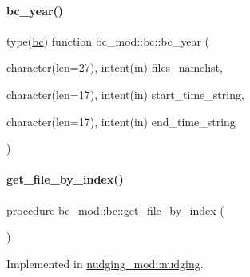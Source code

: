\mbox{\label{structbc__mod_1_1bc_ad1e474e0627921dd48884966e30f379d}} 
\paragraph{\texorpdfstring{bc\+\_\+year()}{bc\_year()}}
{\footnotesize\ttfamily type(\mbox{\hyperlink{structbc__mod_1_1bc}{bc}}) function bc\+\_\+mod\+::bc\+::bc\+\_\+year (\begin{DoxyParamCaption}\item[{character(len=27), intent(in)}]{files\+\_\+namelist,  }\item[{character(len=17), intent(in)}]{start\+\_\+time\+\_\+string,  }\item[{character(len=17), intent(in)}]{end\+\_\+time\+\_\+string }\end{DoxyParamCaption})\hspace{0.3cm}{\ttfamily [private]}}

\mbox{\label{structbc__mod_1_1bc_aad031a20982832747243dc3e3fbfce20}} 
\paragraph{\texorpdfstring{get\+\_\+file\+\_\+by\+\_\+index()}{get\_file\_by\_index()}}
{\footnotesize\ttfamily procedure bc\+\_\+mod\+::bc\+::get\+\_\+file\+\_\+by\+\_\+index (\begin{DoxyParamCaption}{ }\end{DoxyParamCaption})\hspace{0.3cm}{\ttfamily [private]}}



Implemented in \mbox{\hyperlink{structnudging__mod_1_1nudging_a76b1b1b5a273bab2e43348de8c7721c6}{nudging\+\_\+mod\+::nudging}}.

\mbox{\label{structbc__mod_1_1bc_a1d7f33a1fd0c18e5ce50af4690c82846}} 
